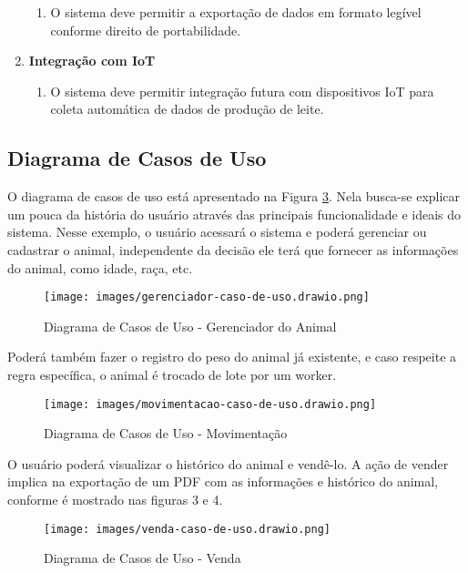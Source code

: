 \documentclass[12pt, a4paper]{article}
\begin{document}
\begin{spacing}{1.5}
\begin{spacing}{1.5}
\begin{enumerate}[label=RNF0\arabic{*}.]
\begin{enumerate}[label=RF12.0\arabic{*}]
        \item O sistema deve permitir a exportação de dados em formato legível conforme direito de portabilidade.
    \end{enumerate}
    \item \textbf{Integração com IoT}
    \begin{enumerate}[label=RF13.0\arabic{*}]
        \item O sistema deve permitir integração futura com dispositivos IoT para coleta automática de dados de produção de leite.
    \end{enumerate}
\end{enumerate}
\end{spacing}

\subsection{Diagrama de Casos de Uso}
\begin{spacing}{1.5}
O diagrama de casos de uso está apresentado na Figura \ref{fig:cases-of-use}. Nela busca-se explicar um pouca da história do usuário através das principais funcionalidade e ideais do sistema. Nesse exemplo, o usuário acessará o sistema e poderá gerenciar ou cadastrar o animal, independente da decisão ele terá que fornecer as informações do animal, como idade, raça, etc.
\begin{figure}[H]
    \centering
    \texttt{[image: images/gerenciador-caso-de-uso.drawio.png]}
    \caption{Diagrama de Casos de Uso - Gerenciador do Animal}
    \label{fig:cases-of-use}
\end{figure}
\end{spacing}
Poderá também fazer o registro do peso do animal já existente, e caso respeite a regra específica, o animal é trocado de lote por um worker.

\begin{figure}[H]
    \centering
    \texttt{[image: images/movimentacao-caso-de-uso.drawio.png]}
    \caption{Diagrama de Casos de Uso - Movimentação}
    \label{fig:cases-of-use}
\end{figure}

 O usuário poderá visualizar o histórico do animal e vendê-lo. A ação de vender implica na exportação de um PDF com as informações e histórico do animal, conforme é mostrado nas figuras 3 e 4.

\begin{figure}[H]
    \centering
    \texttt{[image: images/venda-caso-de-uso.drawio.png]}
    \caption{Diagrama de Casos de Uso - Venda}
    \label{fig:cases-of-use}
\end{figure}
\end{spacing}
\end{document}
